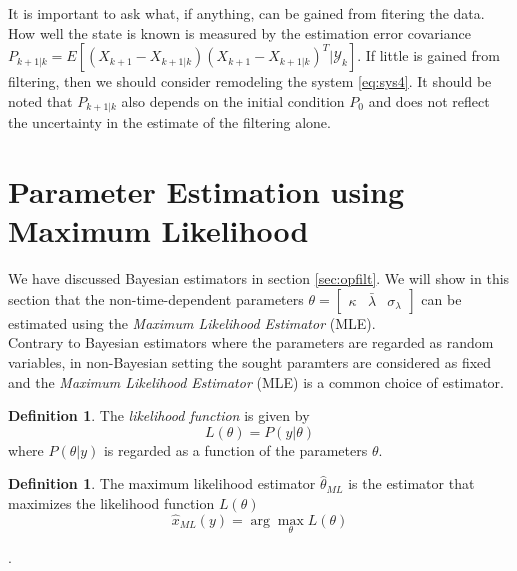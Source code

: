 \documentclass{article}
\theoremstyle{definition}
\newtheorem{definition}[thm]{Definition}
\theoremstyle{remark}
\newcommand{\filtrationObs}[1]{\ensuremath{\mathscr{Y}_{#1}}}
\begin{document}
It is important to ask what, if anything, can be gained from fitering the data. How well the state is known is measured by the estimation error covariance $P_{k+1|k}=E[(X_{k+1}-X_{k+1|k})(X_{k+1}-X_{k+1|k})^T|\filtrationObs{k}]$. If little is gained from filtering, then we should consider remodeling the system \eqref{eq:sys4}. It should be noted that $P_{k+1|k}$ also depends on the initial condition $P_0$ and does not reflect the uncertainty in the estimate of the filtering alone.








\newpage
\section{Parameter Estimation using Maximum Likelihood}\label{sec:est}
We have discussed Bayesian estimators in section \ref{sec:opfilt}. We will show in this section that the non-time-dependent parameters $\theta=\begin{bmatrix} \kappa & \bar{\lambda} & \sigma_\lambda \end{bmatrix}$ can be estimated using the \emph{Maximum Likelihood Estimator }(MLE).\\ 

Contrary to Bayesian estimators where the parameters are regarded as random variables, in non-Bayesian setting the sought paramters are considered as fixed and the \emph{Maximum Likelihood Estimator} (MLE) is a common choice of estimator.



\begin{definition}
The \emph{likelihood function} is given by
\begin{equation}
L(\theta)=P(y|\theta)
\end{equation}
where $P(\theta|y)$ is regarded as a function of the parameters $\theta$.

\end{definition}

\begin{definition}
The maximum likelihood estimator $\hat{\theta}_{ML}$ is the estimator that maximizes the likelihood function $L(\theta)$
\begin{equation}
\hat{x}_{ML}(y)=\arg\max_{\theta} L(\theta)
\end{equation}
\end{definition}
{\tiny .}
\end{document}
